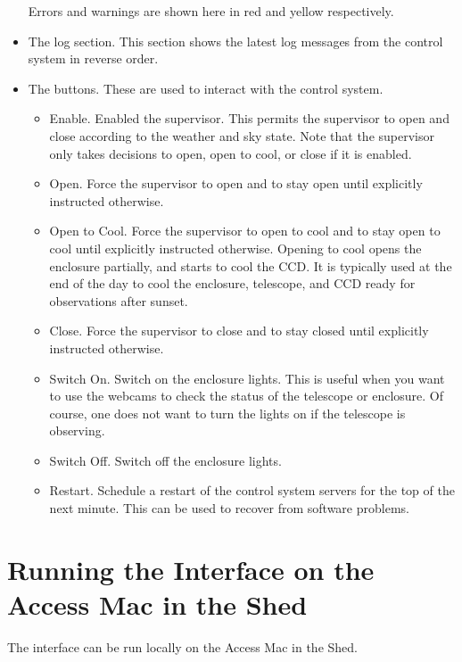 \begin{itemize}
Errors and warnings are shown here in red and yellow respectively.
\item
The log section. This section shows the latest log messages from the control system in reverse order.
\item
The buttons. These are used to interact with the control system.
\begin{itemize}
\item
Enable. Enabled the supervisor. This permits the supervisor to open and close according to the weather and sky state. Note that the supervisor only takes decisions to open, open to cool, or close if it is enabled. 
\item
Open. Force the supervisor to open and to stay open until explicitly instructed otherwise.
\item
Open to Cool. Force the supervisor to open to cool and to stay open to cool until explicitly instructed otherwise. Opening to cool opens the enclosure partially,  and starts to cool the CCD. It is typically used at the end of the day to cool the enclosure, telescope, and CCD ready for observations after sunset.
\item
Close. Force the supervisor  to close and to stay closed until explicitly instructed otherwise.
\label{interface-close-button}
\item
Switch On. Switch on the enclosure lights. This is useful when you want to use the webcams to check the status of the telescope or enclosure. Of course, one does not want to turn the lights on if the telescope is observing.
\label{interface-switch-on-button}
\item
Switch Off. Switch off the enclosure lights. 
\label{interface-switch-off-button}

\item
Restart. Schedule a restart of the control system servers for the top of the next minute. This can be used to recover from software problems.
\label{interface-restart-button}

\end{itemize}
\end{itemize}

\section{Running the Interface on the Access Mac in the Shed}
\label{section:interface-access-mac}

The interface can be run locally on the Access Mac in the Shed.

